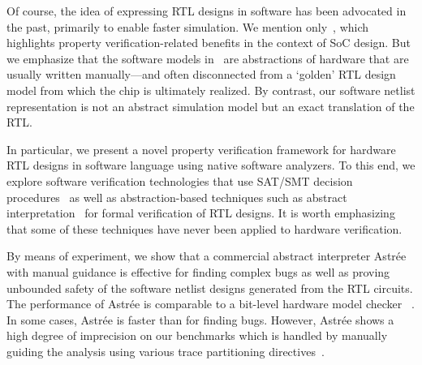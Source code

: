 Of course, the idea of expressing RTL designs in software has been  advocated in the past, primarily to enable faster simulation. We mention only~\cite{soc-keating}, which highlights property 
verification-related benefits in the context of SoC design.  But we emphasize that the software models in~\cite{soc-keating} are abstractions of hardware that are usually written manually---and often disconnected from a `golden' RTL design model from which the chip is ultimately realized.  By contrast, our software netlist representation is not an abstract simulation model but an exact translation of the RTL. 

In particular, we present a novel property verification framework 
for hardware RTL designs in software language using native 
software analyzers.  To this end, we explore software verification 
technologies that use SAT/SMT decision procedures~\cite{DBLP:conf/cav/BeyerK11,
2ls,cbmc.tacas:2004,DBLP:conf/tacas/HeizmannDGLMSP16} as well as abstraction-based 
techniques such as abstract interpretation~\cite{CC79} for formal verification 
of RTL designs.  It is worth emphasizing that some of these techniques 
have never been applied to hardware verification.  
%

By means of experiment, we show that a commercial abstract interpreter  
Astr{\'e}e with manual guidance is effective for finding complex bugs 
as well as proving unbounded safety of the software netlist designs 
generated from the RTL circuits.  The performance of Astr{\'e}e is 
comparable to a bit-level hardware model checker \ABC~\cite{abc}.  
%
In some cases, Astr{\'e}e is faster than \ABC for finding bugs. 
%
However, Astr{\'e}e shows a high degree of imprecision on our benchmarks 
which is handled by manually guiding the analysis using various trace 
partitioning directives~\cite{DBLP:journals/toplas/RivalM07}.  
%
